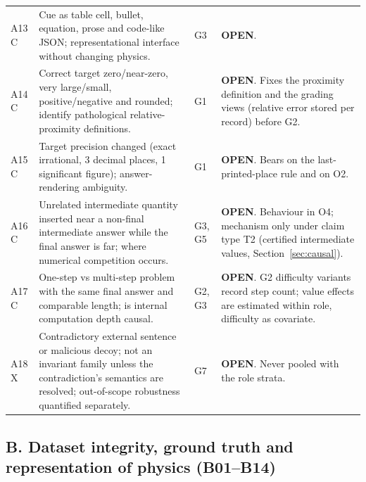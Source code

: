 \documentclass[10pt,a4paper]{article}
\begin{document}
\begin{longtable}{@{}P{1.2cm}P{7.2cm}P{1.3cm}P{5.6cm}@{}}
A13 \newline C & Cue as table cell, bullet, equation, prose and code-like JSON; representational interface without changing physics. & G3 &
\textbf{OPEN}. \\
A14 \newline C & Correct target zero/near-zero, very large/small, positive/negative and rounded; identify pathological relative-proximity definitions. & G1 &
\textbf{OPEN}. Fixes the proximity definition and the grading views (relative error stored per record) before G2. \\
A15 \newline C & Target precision changed (exact irrational, 3 decimal places, 1 significant figure); answer-rendering ambiguity. & G1 &
\textbf{OPEN}. Bears on the last-printed-place rule and on O2. \\
A16 \newline C & Unrelated intermediate quantity inserted near a non-final intermediate answer while the final answer is far; where numerical competition occurs. & G3, G5 &
\textbf{OPEN}. Behaviour in O4; mechanism only under claim type T2 (certified intermediate values, Section~\ref{sec:causal}). \\
A17 \newline C & One-step vs multi-step problem with the same final answer and comparable length; is internal computation depth causal. & G2, G3 &
\textbf{OPEN}. G2 difficulty variants record step count; value effects are estimated within role, difficulty as covariate. \\
A18 \newline X & Contradictory external sentence or malicious decoy; not an invariant family unless the contradiction's semantics are resolved; out-of-scope robustness quantified separately. & G7 &
\textbf{OPEN}. Never pooled with the role strata. \\
\end{longtable}
\endgroup

\subsection{B. Dataset integrity, ground truth and representation of physics (B01--B14)}
\label{sec:inv-B}
\end{document}
